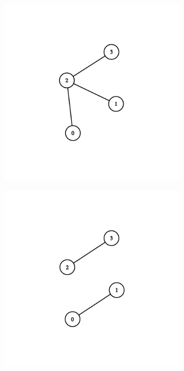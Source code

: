 \documentclass[12pt, a4paper, hidelinks]{article}
\begin{document}
\begin{figure}[H]
    \centering
    \begin{subfigure}[b]{0.45\textwidth}
        \includegraphics[width=\textwidth]{graph_v4_9.png}
    \end{subfigure}
    \begin{subfigure}[b]{0.45\textwidth}
        \includegraphics[width=\textwidth]{graph_v4_10.png}
    \end{subfigure}
\end{figure}
\end{document}
